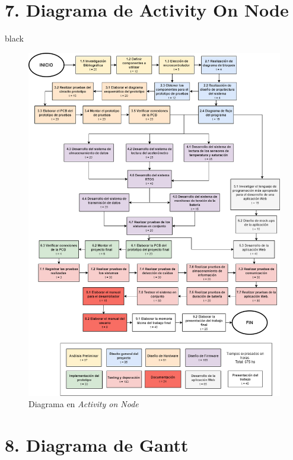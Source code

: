 \documentclass[11pt]{charter}
\begin{document}
\vspace{15px}
\section{7. Diagrama de Activity On Node}
\label{sec:AoN}

\begin{consigna}{black} 



\begin{figure}[htpb]
\centering 
\includegraphics[width=.8\textwidth]{./Figuras/AoN.png}
\caption{Diagrama en \textit{Activity on Node}}
\label{fig:AoN}
\end{figure}

\end{consigna}

\section{8. Diagrama de Gantt}
\label{sec:gantt}
\end{document}

